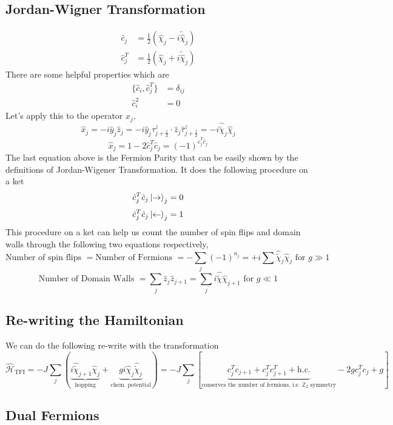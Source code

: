 \documentclass[letterpaper]{article}
\begin{document}
\subsection*{Jordan-Wigner Transformation} 
\begin{align}
	\hat{c}_j &= \frac{1}{2} \left(\hat{\chi}_j - i \tilde{\hat{\chi}}_j \right)	\\
	\hat{c}_j ^{T}&= \frac{1}{2} \left(\hat{\chi}_j + i \tilde{\hat{\chi}}_j \right)	
\end{align}
There are some helpful properties which are 
\begin{align*}
	\{\hat{c}_i , \hat{c}_j ^{T} \} &= \delta_{ij} \\
	\hat{c}_i ^2 &= 0 
\end{align*}
Let's apply this to the operator $\hat{x}_j$, 
\[
	\hat{x}_j = -i \hat{y}_j \hat{z}_j = - i \hat{y}_j \hat{\tau}_{j + \frac{1}{2}} ^{z} \cdot  
	\hat{z}_j \hat{\tau}_{j+ \frac{1}{2}}^{z} = - i \hat{\tilde{\chi}}_j \hat{\chi}_j
\] 
\[
	\hat{x}_j = 1 - 2 \hat{c}_j ^{T} \hat{c}_j  = (-1)^{\hat{c}_j ^{T} \hat{c}_j}
\]
The last equation above is the Fermion Parity that can be easily shown by the definitions of Jordan-Wigener Transformation. It does the following procedure on a ket
\[
\hat{c}_j ^{T} \hat{c}_j \ket{\rightarrow} _j = 0 
\]
\[
\hat{c}_j ^{T} \hat{c}_j \ket{\leftarrow} _j =  1
\] 
This procedure on a ket can help us count the number of spin flips and domain walls through the following two equations respectively, 
\[
	\text{Number of spin flips } = \text{Number of Fermions } = - \sum_{j}^{} (-1)^{n_j} = +i \sum_{}^{} \hat{\tilde{\chi}}_j \hat{\chi}_j \text{ for } g \gg 1
\]
\[
	\text{Number of Domain Walls }= \sum_{j}^{} \hat{z}_j \hat{z}_{j+1} = 
	\sum_{j}^{} i \hat{\tilde{\chi}} \hat{\chi}_{j+1} \text{ for } g \ll 1 
\]

\subsection*{Re-writing the Hamiltonian} 
We can do the following re-write with the transformation 
\[
	\hat{\mathcal H} _{\text{TFI}} = - J \sum_{j}^{} (\underbrace{i \hat{\tilde{\chi}}_{j+1} \hat\chi_j }_{\text{hopping}} 
	+ \underbrace{g i \hat{\chi}_j \hat{\tilde{\chi}} _j}_{\text{chem. potential}} 
	)
	=
	-J 
	\sum_j \left[\underbrace{
		c_j ^{T} c_{j+1} + c_j ^{T} c_{j+1} ^{T} + \text{h.c.}}_{\text{conserves the number of fermions, i.e. $\mathbb Z_2 $ symmetry}} - 2 g c_j ^{T} c_j	  + g
	\right]
\] 


\subsection*{Dual Fermions} 
\end{document}
